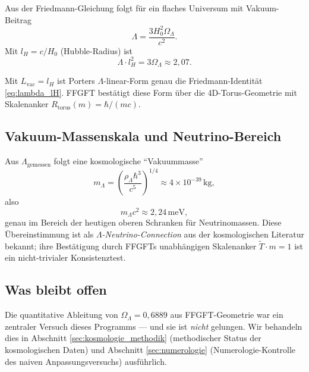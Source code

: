 Aus der Friedmann-Gleichung folgt für ein flaches Universum mit Vakuum-Beitrag
\begin{equation}
\Lambda = \frac{3 H_0^2 \Omega_\Lambda}{c^2}.
\end{equation}
Mit \(l_H = c/H_0\) (Hubble-Radius) ist
\begin{equation}
\Lambda \cdot l_H^2 = 3 \Omega_\Lambda \approx 2{,}07.
\label{eq:lambda_lH}
\end{equation}

\begin{keyresult}
Mit \(L_\text{vac} = l_H\) ist Porters \(\Lambda\)-linear-Form genau die Friedmann-Identität \eqref{eq:lambda_lH}. FFGFT bestätigt diese Form über die 4D-Torus-Geometrie mit Skalenanker \(R_\text{torus}(m) = \hbar/(mc)\).
\end{keyresult}

\subsection{Vakuum-Massenskala und Neutrino-Bereich}

Aus \(\Lambda_\text{gemessen}\) folgt eine kosmologische ``Vakuummasse''
\begin{equation}
m_\Lambda = \left(\frac{\rho_\Lambda \hbar^3}{c^5}\right)^{1/4} \approx 4 \times 10^{-39}\,\text{kg},
\end{equation}
also
\begin{equation}
m_\Lambda c^2 \approx 2{,}24\,\text{meV},
\end{equation}
genau im Bereich der heutigen oberen Schranken für Neutrinomassen. Diese Übereinstimmung ist als \emph{\(\Lambda\)-Neutrino-Connection} aus der kosmologischen Literatur bekannt; ihre Bestätigung durch FFGFTs unabhängigen Skalenanker \(\tilde T \cdot m = 1\) ist ein nicht-trivialer Konsistenztest.

\subsection{Was bleibt offen}

Die quantitative Ableitung von \(\Omega_\Lambda = 0{,}6889\) aus FFGFT-Geometrie war ein zentraler Versuch dieses Programms — und sie ist \emph{nicht} gelungen. Wir behandeln dies in Abschnitt \ref{sec:kosmologie_methodik} (methodischer Status der kosmologischen Daten) und Abschnitt \ref{sec:numerologie} (Numerologie-Kontrolle des naiven Anpassungsversuchs) ausführlich.

